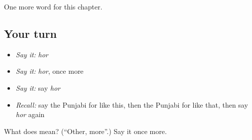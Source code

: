 \begin{grammarlens}[title={What you've built}]
One more word for this chapter.
\end{grammarlens}

\subsection*{Your turn}
\begin{itemize}
\raggedright
  \item \emph{Say it:} \emph{hor}
  \item \emph{Say it:} \emph{hor}, once more
  \item \emph{Say it:} say \emph{hor}
  \item \emph{Recall:} say the Punjabi for like this, then the Punjabi for like that, then say \emph{hor} again
\end{itemize}

\begin{tcolorbox}[breakable,colback=teal!4,colframe=teal!35!black,title={Before you move on}]
What does  mean? (\textquotedblleft{}Other, more\textquotedblright{}.) Say it once more.
\end{tcolorbox}
